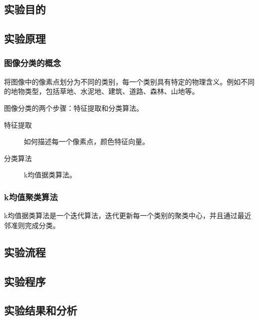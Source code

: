 \subsection{实验目的}
\subsection{实验原理}
\subsubsection{图像分类的概念}
将图像中的像素点划分为不同的类别，每一个类别具有特定的物理含义。例如不同的地物类型，包括草地、水泥地、建筑、道路、森林、山地等。

图像分类的两个步骤：特征提取和分类算法。
\begin{description}
	\item[特征提取] 如何描述每一个像素点，颜色特征向量。
	\item[分类算法] k均值据类算法。
\end{description}
\subsubsection{k均值聚类算法}
k均值据类算法是一个迭代算法，迭代更新每一个类别的聚类中心，并且通过最近邻准则完成分类。
\subsection{实验流程}
\subsection{实验程序}
\subsection{实验结果和分析}